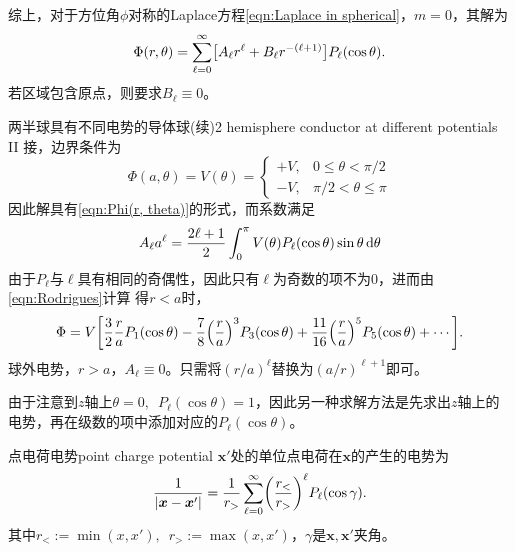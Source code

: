 综上，对于方位角$\phi$对称的Laplace方程\eqref{eqn:Laplace in spherical}，$m=0$，其解为
\begin{equation}
    \label{eqn:Phi(r, theta)}
    \Phi(r,\theta)=\sum_{\ell=0}^\infty\bigl[A_\ell r^\ell+B_\ell r^{-(\ell+1)}\bigr]P_\ell(\cos\theta).
\end{equation}
若区域包含原点，则要求$B_\ell\equiv 0$。
\begin{example}{两半球具有不同电势的导体球(续)}{2 hemisphere conductor at different potentials II}
    接，边界条件为
    \[
        \Phi(a,\theta)=V(\theta)=
        \begin{cases}
            +V,&0\leqslant\theta<\pi/2\\
            -V,&\pi/2<\theta\leqslant\pi
        \end{cases}
    \]
    因此解具有\eqref{eqn:Phi(r, theta)}的形式，而系数满足
    \[
        A_\ell a^\ell=\frac{2\ell+1}2\int_0^\pi V(\theta)P_\ell(\cos\theta)\sin\theta\mathop{}\!\mathrm{d}\theta
    \]
    由于$P_\ell$与$\ell$具有相同的奇偶性，因此只有$\ell$为奇数的项不为0，进而由\eqref{eqn:Rodrigues}计算
    得$r<a$时，
    \[
        \Phi=V\biggl[\frac32\frac raP_1(\cos\theta)-\frac78\Bigl(\frac ra\Bigr)^3P_3(\cos\theta)+\frac{11}{16}\Bigl(\frac ra\Bigr)^5P_5(\cos\theta)+\cdots\biggr].
    \]
    \tcblower
    球外电势，$r>a$，$A_\ell\equiv 0$。只需将$(r/a)^\ell$替换为$(a/r)^{\ell+1}$即可。
\end{example}
由于注意到$z$轴上$\theta=0,\enspace P_\ell(\cos\theta)=1$，因此另一种求解方法是先求出$z$轴上的电势，再在级数的项中添加对应的$P_\ell(\cos\theta)$。

\begin{example}{点电荷电势}{point charge potential}
    $\bm x'$处的单位点电荷在$\bm x$的产生的电势为
    \begin{equation}
        \label{eqn:1/|x-x'|}
        \frac1{|\bm x-\bm x'|}=\frac1{r_>}\sum_{\ell=0}^\infty\biggl(\frac{r_<}{r_>}\biggr)^\ell P_\ell(\cos\gamma).
    \end{equation}
    其中$r_<:=\min(x,x'),\enspace r_>:=\max(x,x')$，$\gamma$是$\bm x,\bm x'$夹角。
\end{example}
    
